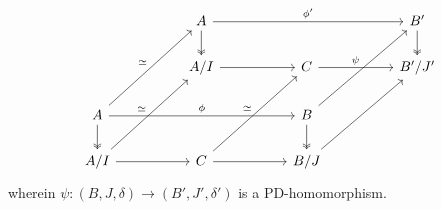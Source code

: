 \begin{definition}[PD-thickenings]
\begin{enumerate}
                                $$
                                    \begin{tikzcd}
                                    	&& A &&&& {B'} \\
                                    	&& {A/I} && C && {B'/J'} \\
                                    	A &&&& B \\
                                    	{A/I} && C && {B/J}
                                    	\arrow[two heads, from=3-1, to=4-1]
                                    	\arrow[two heads, from=3-5, to=4-5]
                                    	\arrow["\phi", from=3-1, to=3-5]
                                    	\arrow[from=4-1, to=4-3]
                                    	\arrow[from=4-3, to=4-5]
                                    	\arrow["{\phi'}", from=1-3, to=1-7]
                                    	\arrow["\cong", from=3-1, to=1-3]
                                    	\arrow["\cong", from=4-1, to=2-3]
                                    	\arrow["\psi", from=3-5, to=1-7]
                                    	\arrow[two heads, from=1-7, to=2-7]
                                    	\arrow[two heads, from=1-3, to=2-3]
                                    	\arrow[from=4-5, to=2-7]
                                    	\arrow[from=2-3, to=2-5]
                                    	\arrow[from=2-5, to=2-7]
                                    	\arrow["\cong", from=4-3, to=2-5]
                                    \end{tikzcd}
                                $$
                            wherein $\psi: (B, J, \delta) \to (B', J', \delta')$ is a PD-homomorphism.
                        \end{enumerate}
                \end{definition}
            
